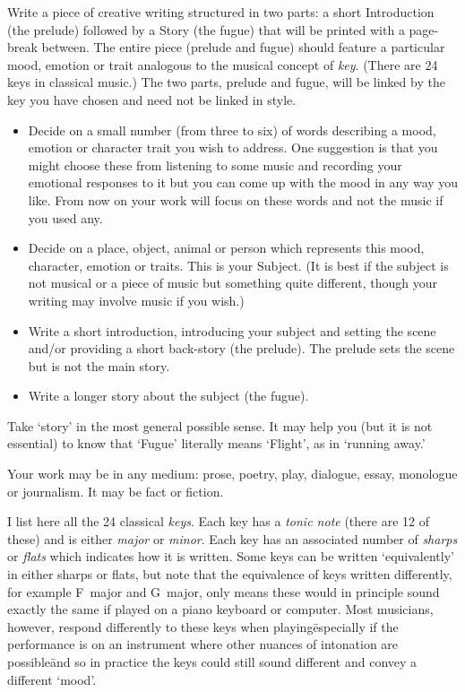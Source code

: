 
Write a piece of creative writing structured in two parts:
a short Introduction (the prelude) followed by a Story
(the fugue) that will be printed with a page-break between.
The entire piece (prelude and fugue) should feature a particular
mood, emotion or trait analogous to the musical concept of
\textit{key}.  (There are 24 keys in classical music.) The two
parts, prelude and fugue, will be linked by the key you have
chosen and need not be linked in style.

\begin{itemize}
\item Decide on a small number (from three to six) of words describing
  a mood, emotion or character trait you wish to address.  One
  suggestion is that you might choose these from listening to some
  music and recording your emotional responses to it but you can come
  up with the mood in any way you like. From now on your work will
  focus on these words and not the music if you used any.
\item Decide on a place, object, animal or person which represents
  this mood, character, emotion or traits.  This is your Subject.  (It
  is best if the subject is not musical or a piece of music but
  something quite different, though your writing may involve music if
  you wish.)
\item Write a short introduction, introducing your subject and setting
  the scene and/or providing a short back-story (the prelude). The
  prelude sets the scene but is not the main story.
\item Write a longer story about the subject (the fugue). 
\end{itemize}

Take `story' in the most general possible sense.  It
may help you (but it is not essential) to know that `Fugue' literally
means `Flight', as in `running away.'

Your work may be in any medium: prose, poetry, play, dialogue, essay,
monologue or journalism.  It may be fact or fiction.


I list here all the 24 classical \textit{keys}.  Each key has a
\textit{tonic note} (there are 12 of these) and is either
\textit{major} or \textit{minor}.  Each key has an associated number
of \textit{sharps} or \textit{flats} which indicates how it is
written.  Some keys can be written `equivalently' in either sharps or
flats, but note that the equivalence of keys written differently, for
example F\sh\ major and G\fl\ major, only means these would in
principle sound exactly the same if played on a piano keyboard or
computer. Most musicians, however, respond differently to these keys
when playing\=especially if the performance is on an
instrument where other nuances of intonation are possible\=and so in
practice the keys could still sound different and convey a different `mood'.

